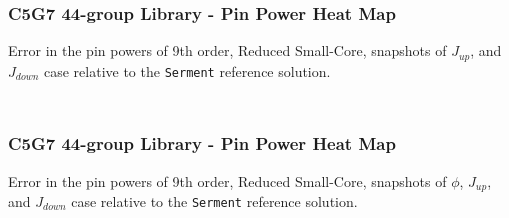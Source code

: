 \documentclass[fleqn]{beamer}
\begin{document}
        \begin{frame}
            \frametitle{C5G7 44-group Library - Pin Power Heat Map}
            \centering
            Error in the pin powers of 9th order, Reduced Small-Core, snapshots
            of $J_{up}$, and $J_{down}$ case relative to the
            {\tt Serment} reference solution.
            \begin{columns}[T]
                \begin{column}{0.5\textwidth}
                    \begin{figure}
                    \end{figure}
                \end{column}
                \begin{column}{0.5\textwidth}
                    \begin{figure}
                    \end{figure}
                \end{column}
            \end{columns}
        \end{frame}

        \begin{frame}
            \frametitle{C5G7 44-group Library - Pin Power Heat Map}
            \centering
            Error in the pin powers of 9th order, Reduced Small-Core, snapshots
            of
            $\phi$, $J_{up}$, and $J_{down}$ case relative to the
            {\tt Serment} reference solution.
            \begin{columns}[T]
                \begin{column}{0.5\textwidth}
                    \begin{figure}
                    \end{figure}
                \end{column}
                \begin{column}{0.5\textwidth}
                    \begin{figure}
                    \end{figure}
                \end{column}
            \end{columns}
        \end{frame}
\end{document}
